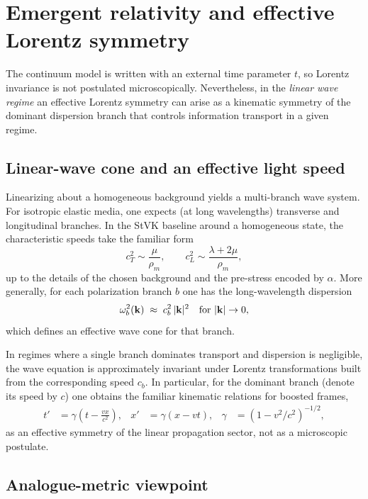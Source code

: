 \section{Emergent relativity and effective Lorentz symmetry}
\label{sec:emergent-relativity}

The continuum model is written with an external time parameter $t$, so Lorentz invariance is not postulated
microscopically. Nevertheless, in the \emph{linear wave regime} an effective Lorentz symmetry can arise as a
kinematic symmetry of the dominant dispersion branch that controls information transport in a given regime.

\subsection{Linear-wave cone and an effective light speed}

Linearizing  about a homogeneous background yields a multi-branch wave system.
For isotropic elastic media, one expects (at long wavelengths) transverse and longitudinal branches.
In the StVK baseline around a homogeneous state, the characteristic speeds take the familiar form
\begin{equation}
  c_T^2 \sim \frac{\mu}{\rho_m},
  \qquad
  c_L^2 \sim \frac{\lambda+2\mu}{\rho_m},
  \label{eq:cl-ct}
\end{equation}
up to the details of the chosen background and the pre-stress encoded by $\alpha$.
More generally, for each polarization branch $b$ one has the long-wavelength dispersion
\begin{equation}
  \omega_b^2(\mathbf{k})\;\approx\; c_b^2\,|\mathbf{k}|^2 \quad \text{for } |\mathbf{k}|\to 0,
  \label{eq:linear-dispersion}
\end{equation}
which defines an effective wave cone for that branch.

In regimes where a single branch dominates transport and dispersion is negligible,
the wave equation is approximately invariant under Lorentz transformations built from the corresponding
speed $c_b$. In particular, for the dominant branch (denote its speed by $c$) one obtains the familiar
kinematic relations for boosted frames,
\begin{align}
t' &= \gamma\left(t-\frac{vx}{c^2}\right),&
x' &= \gamma(x-vt),&
\gamma &= (1-v^2/c^2)^{-1/2},
\label{eq:lorentz}
\end{align}
as an effective symmetry of the linear propagation sector, not as a microscopic postulate.

\subsection{Analogue-metric viewpoint}

